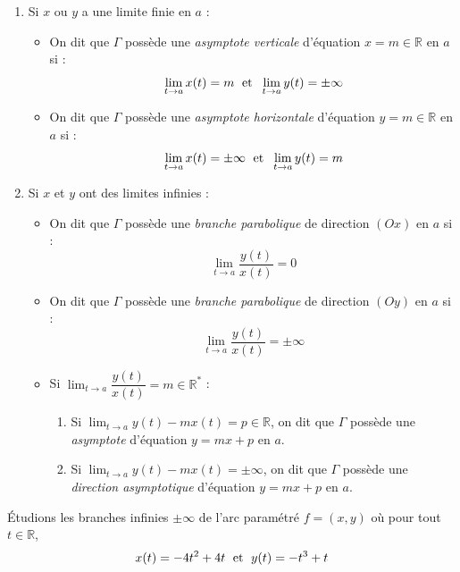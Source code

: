 \documentclass[a4paper,10pt]{report}
\begin{document}
 \begin{enumerate}
 \item Si $x$ ou $y$ a une limite finie en $a$ :
 \begin{itemize}
 \item On dit que $\Gamma$ possède une \emph{asymptote verticale} d'équation $x=m \in \mathbb{R}$ en $a$ si :
 $$ \lim_{t \rightarrow a} x(t)=m \; \hbox{ et } \; \lim_{t \rightarrow a} y(t) =\pm  \infty $$
  \item On dit que $\Gamma$ possède une \emph{asymptote horizontale} d'équation $y=m \in \mathbb{R}$ en $a$ si :
 $$ \lim_{t \rightarrow a} x(t)=\pm \infty \; \hbox{ et } \; \lim_{t \rightarrow a} y(t) = m$$
 \end{itemize}
 \item Si $x$ et $y$ ont des limites infinies :
 \begin{itemize}
 \item On dit que $\Gamma$ possède une \emph{branche parabolique} de direction $(Ox)$ en $a$ si :
 $$ \lim_{t \rightarrow a} \dfrac{y(t)}{x(t)} = 0$$
 \item  On dit que $\Gamma$ possède une \emph{branche parabolique} de direction $(Oy)$ en $a$ si :
 $$ \lim_{t \rightarrow a} \dfrac{y(t)}{x(t)} = \pm \infty$$
 \item Si $\lim_{t \rightarrow a} \dfrac{y(t)}{x(t)} = m \in \mathbb{R}^*$ :
 \begin{enumerate}
 \item Si $\lim_{t \rightarrow a} y(t)-mx(t) = p \in \mathbb{R}$, on dit que $\Gamma$ possède une \emph{asymptote} d'équation $y=mx+p$ en $a$.
  \item Si $\lim_{t \rightarrow a} y(t)-mx(t) = \pm \infty$, on dit que $\Gamma$ possède une \emph{direction asymptotique} d'équation $y=mx+p$ en $a$.
 \end{enumerate}
 \end{itemize}
 \end{enumerate}
 
\begin{Exemple} Étudions les branches infinies $\pm \infty$ de l'arc paramétré $f=(x,y)$ où pour tout $t \in \mathbb{R}$,
$$ x(t) = -4t^2+4t \; \hbox{ et } \; y(t)=-t^3+t$$

\vspace{5cm}
\end{Exemple}

%
\end{document}
